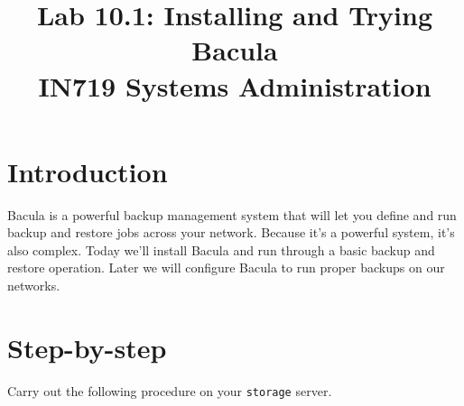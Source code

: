 \documentclass{article}   	%
\title{Lab 10.1:  Installing and Trying Bacula\\ IN719 Systems Administration}
\date{}							%
\begin{document}
\maketitle

\section*{Introduction}
Bacula is a powerful backup management system that will let you define and run backup and restore jobs across your network.  Because it's a powerful system, it's also complex.  Today we'll install Bacula and run through a basic backup and restore operation.  Later we will configure Bacula to run proper backups on our networks.

\section*{Step-by-step}
Carry out the following procedure on your \texttt{storage} server.
\end{document}
